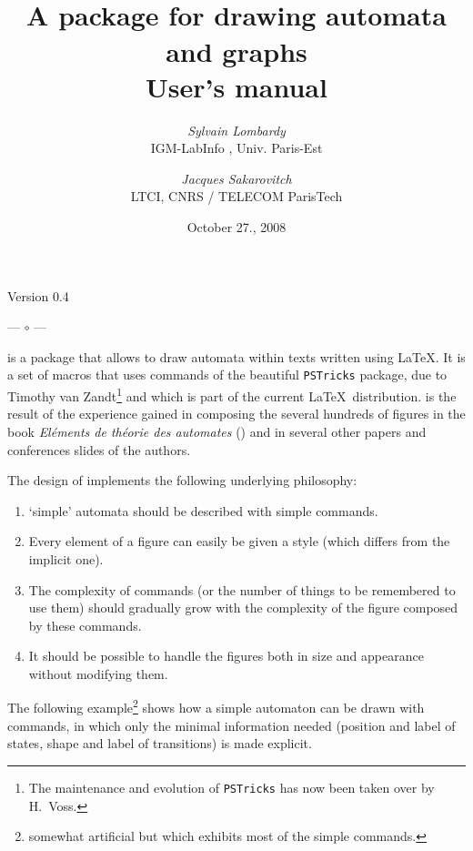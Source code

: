 \documentclass[11pt,twoside]{article}
\newif\ifital \italfalse %
\newcommand{\sep}%
{\begin{center}
       --- $\circ$ ---
 \end{center}}
\newcommand{\PSTricks}{\texttt{PSTricks}\xspace}
\begin{document}
%
\ifital \thispagestyle{empty}\mbox{ }\clearpage%
       \addtocounter{page}{-1}\fi
%       
\title{{\LARGE \VCSG}\\
A package for drawing automata and graphs\\
\smallskip
{\large User's  manual}}
\author{%
\textsl{Sylvain Lombardy}\\[0.5ex]
{\normalsize IGM-LabInfo , Univ. Paris-Est}%
\and 
\textsl{Jacques Sakarovitch}\\[0.5ex]
{\normalsize LTCI, CNRS / TELECOM ParisTech}%
}

\date{October 27.,  2008}
\maketitle 
        
\begin{center}
{\large Version 0.4}
\end{center}
\sep
%
\VCSG is a package that allows to draw automata within 
texts written using \LaTeX.
It is a set of macros that uses commands of the beautiful \PSTricks package,
due to Timothy van Zandt\footnote{%
   The maintenance and evolution of \PSTricks has now been taken over by H.~Voss.}
and which is part of 
the current \LaTeX\ distribution.
\VCSG is the result of the experience gained in composing the several
hundreds of 
figures in the book \emph{El\'ements de th\'eorie des automates} 
(\cite{Sak01}) and in several other papers and conferences slides
of the authors.

The design of \VCSG implements the following
underlying philosophy:
\begin{enumerate}
    \item  `simple' automata should be 
described with simple commands.

    \item Every element of a figure can easily be given a style 
    (which differs from the implicit one).

    \item  The complexity of commands (or the number of things to be remembered 
to use them) should gradually grow with the complexity of the figure 
composed by these commands.

    \item  It should be possible to handle the figures both in size and 
        appearance without modifying them.
\end{enumerate}

The following example\footnote{%
    somewhat artificial but which exhibits most of the simple commands.}
shows how a simple automaton can be drawn 
with commands, in which only the minimal information needed (position 
and label of states, shape and label of transitions) is made explicit.
\end{document}
